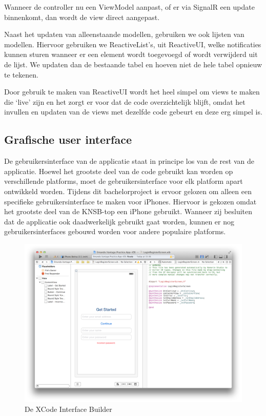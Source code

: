 
Wanneer de controller nu een ViewModel aanpast, of er via SignalR een update binnenkomt, dan wordt de view direct aangepast. 

Naast het updaten van alleenstaande modellen, gebruiken we ook lijsten van modellen. Hiervoor gebruiken we ReactiveList's, uit ReactiveUI, welke notificaties kunnen sturen wanneer er een element wordt toegevoegd of wordt verwijderd uit de lijst. We updaten dan de bestaande tabel en hoeven niet de hele tabel opnieuw te tekenen.

Door gebruik te maken van ReactiveUI wordt het heel simpel om views te maken die `live' zijn en het zorgt er voor dat de code overzichtelijk blijft, omdat het invullen en updaten van de views met dezelfde code gebeurt en deze erg simpel is.

\subsection{Grafische user interface}

De gebruikersinterface van de applicatie staat in principe los van de rest van de applicatie. Hoewel het grootste deel van de code gebruikt kan worden op verschillende platforms, moet de gebruikersinterface voor elk platform apart ontwikkeld worden. Tijdens dit bachelorproject is ervoor gelozen om alleen een specifieke gebruikersinterface te maken voor iPhones. Hiervoor is gekozen omdat het grootste deel van de KNSB-top een iPhone gebruikt. Wanneer zij besluiten dat de applicatie ook daadwerkelijk gebruikt gaat worden, kunnen er nog gebruikersinterfaces gebouwd worden voor andere populaire platforms.

\begin{figure}[h!t]
\centering
\includegraphics[width=\textwidth]{style/images/screenshots/InterfaceBuilder}
\caption{De XCode Interface Builder}
\label{fig:interface-builder}
\end{figure}

